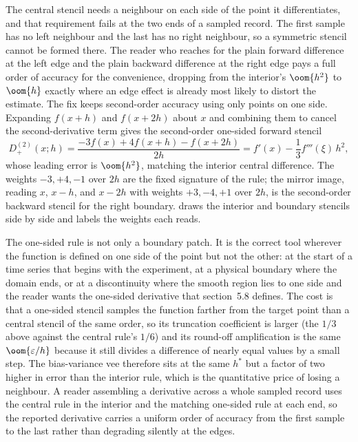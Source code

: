 The central stencil needs a neighbour on each side of the point it
differentiates, and that requirement fails at the two ends of a
sampled record. The first sample has no left neighbour and the last
has no right neighbour, so a symmetric stencil cannot be formed there.
The reader who reaches for the plain forward difference at the left
edge and the plain backward difference at the right edge pays a full
order of accuracy for the convenience, dropping from the interior's
$\oom{h^{2}}$ to $\oom{h}$ exactly where an edge effect is already most
likely to distort the estimate. The fix keeps second-order accuracy
using only points on one side. Expanding $f(x + h)$ and $f(x + 2h)$
about $x$ and combining them to cancel the second-derivative term
gives the second-order one-sided forward stencil
\[
D_{+}^{(2)}(x; h) = \frac{-3 f(x) + 4 f(x + h) - f(x + 2h)}{2 h}
= f'(x) - \frac{1}{3} f'''(\xi)\,h^{2},
\]
whose leading error is $\oom{h^{2}}$, matching the interior central
difference. The weights $-3, +4, -1$ over $2h$ are the fixed
signature of the rule; the mirror image, reading $x$, $x - h$, and
$x - 2h$ with weights $+3, -4, +1$ over $2h$, is the second-order
backward stencil for the right boundary.
 draws the interior and boundary
stencils side by side and labels the weights each reads.



The one-sided rule is not only a boundary patch. It is the correct
tool wherever the function is defined on one side of the point but not
the other: at the start of a time series that begins with the
experiment, at a physical boundary where the domain ends, or at a
discontinuity where the smooth region lies to one side and the reader
wants the one-sided derivative that section~5.8 defines. The cost is
that a one-sided stencil samples the function farther from the target
point than a central stencil of the same order, so its truncation
coefficient is larger (the $1/3$ above against the central rule's
$1/6$) and its round-off amplification is the same $\oom{\varepsilon/h}$
because it still divides a difference of nearly equal values by a small
step. The bias-variance vee therefore sits at the same $h^{*}$ but a
factor of two higher in error than the interior rule, which is the
quantitative price of losing a neighbour. A reader assembling a
derivative across a whole sampled record uses the central rule in the
interior and the matching one-sided rule at each end, so the reported
derivative carries a uniform order of accuracy from the first sample to
the last rather than degrading silently at the edges.

